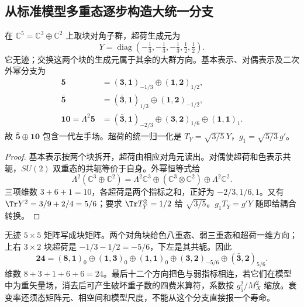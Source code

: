 \subsection{从标准模型多重态逐步构造大统一分支}

\begin{proposition}[$SU(5)$ 嵌入与超荷归一化]
在 $\mathbb C^5=\mathbb C^3\oplus\mathbb C^2$ 上取块对角子群，超荷生成元为
\[
 Y=\operatorname{diag}(-\tfrac13,-\tfrac13,-\tfrac13,\tfrac12,\tfrac12).
\]
它无迹；交换这两个块的生成元属于其余的大群方向。基本表示、对偶表示及二次外幂分支为
\begin{align}
 \mathbf5&=(\mathbf3,\mathbf1)_{-1/3}\oplus(\mathbf1,\mathbf2)_{1/2},\\
 \bar{\mathbf5}&=(\bar{\mathbf3},\mathbf1)_{1/3}\oplus(\mathbf1,\mathbf2)_{-1/2},\\
 \mathbf{10}=\Lambda^2\mathbf5
 &=(\bar{\mathbf3},\mathbf1)_{-2/3}\oplus(\mathbf3,\mathbf2)_{1/6}\oplus(\mathbf1,\mathbf1)_1.
 \label{eq:su5-fermion-branch}
\end{align}
故 $\bar{\mathbf5}\oplus\mathbf{10}$ 包含一代左手场。超荷的统一归一化是 $T_Y=\sqrt{3/5}\,Y$，$g_1=\sqrt{5/3}\,g'$。
\end{proposition}
\begin{proof}
基本表示按两个块拆开，超荷由相应对角元读出。对偶使超荷和色表示共轭，$SU(2)$ 双重态的共轭等价于自身。外幂恒等式给
\[
 \Lambda^2(\mathbb C^3\oplus\mathbb C^2)
 =\Lambda^2\mathbb C^3\oplus(\mathbb C^3\otimes\mathbb C^2)\oplus\Lambda^2\mathbb C^2.
\]
三项维数 $3+6+1=10$，各超荷是两个指标之和，正好为 $-2/3,1/6,1$。又有 $\Tr Y^2=3/9+2/4=5/6$；要求 $\Tr T_Y^2=1/2$ 给 $\sqrt{3/5}$。$g_1T_Y=g'Y$ 随即给耦合转换。
\end{proof}

\begin{workedexample}[额外规范玻色子的表示]
无迹 $5\times5$ 矩阵写成块矩阵。两个对角块给色八重态、弱三重态和超荷一维方向；上右 $3\times2$ 块超荷是 $-1/3-1/2=-5/6$，下左是其共轭。因此
\[
 \mathbf{24}=(\mathbf8,\mathbf1)_0\oplus(\mathbf1,\mathbf3)_0\oplus(\mathbf1,\mathbf1)_0
 \oplus(\mathbf3,\mathbf2)_{-5/6}\oplus(\bar{\mathbf3},\mathbf2)_{5/6}.
\]
维数 $8+3+1+6+6=24$。最后十二个方向把色与弱指标相连，若它们在模型中为重矢量场，消去后可产生破坏重子数的四费米算符，系数按 $g_5^2/M_X^2$ 缩放。衰变率还须态矩阵元、相空间和模型尺度，不能从这个分支直接报一个寿命。
\end{workedexample}

